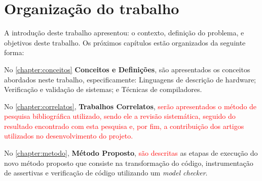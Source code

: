 % 


\section{Organização do trabalho}
A introdução deste trabalho apresentou: o contexto, definição do problema, e objetivos deste trabalho. Os próximos capítulos estão organizados da seguinte forma:

\par
No \autoref{chapter:conceitos} \textbf{Conceitos e Definições}, são apresentados os conceitos abordados neste trabalho, especificamente: Linguagens de descrição de hardware; Verificação e validação de sistemas; e Técnicas de compiladores.

\par
No \autoref{chapter:correlatos}, \textbf{Trabalhos Correlatos}, \textcolor{red}{serão apresentados o método de pesquisa bibliográfica utilizado, sendo ele a revisão sistemática, seguido do resultado encontrado com esta pesquisa e, por fim, a contribuição dos artigos utilizados no desenvolvimento do projeto.} 

\par
No \autoref{chapter:metodo}, \textbf{Método Proposto}, \textcolor{red}{são descritas} as etapas de execução do novo método proposto que consiste na transformação do código, instrumentação de assertivas e verificação de código utilizando um \textit{model checker}.

